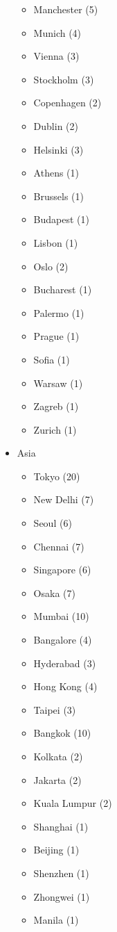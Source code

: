 \begin{itemize}
\begin{itemize}
     \item Manchester (5)
     \item Munich (4)
     \item Vienna (3)
     \item Stockholm (3)
     \item Copenhagen (2)
     \item Dublin (2)
     \item Helsinki (3)
     \item Athens (1)
     \item Brussels (1)
     \item Budapest (1)
     \item Lisbon (1)
     \item Oslo (2)
     \item Bucharest (1)
     \item Palermo (1)
     \item Prague (1)
     \item Sofia (1)
     \item Warsaw (1)
     \item Zagreb (1)
     \item Zurich (1)
   \end{itemize}
   \item Asia
   \begin{itemize}
     \item Tokyo (20)
     \item New Delhi (7)
     \item Seoul (6)
     \item Chennai (7)
     \item Singapore (6)
     \item Osaka (7)
     \item Mumbai (10)
     \item Bangalore (4)
     \item Hyderabad (3)
     \item Hong Kong (4)
     \item Taipei (3)
     \item Bangkok (10)
     \item Kolkata (2)
     \item Jakarta (2)
     \item Kuala Lumpur (2)
     \item Shanghai (1)
     \item Beijing (1)
     \item Shenzhen (1)
     \item Zhongwei (1)
     \item Manila (1)

\end{itemize}
\end{itemize}

